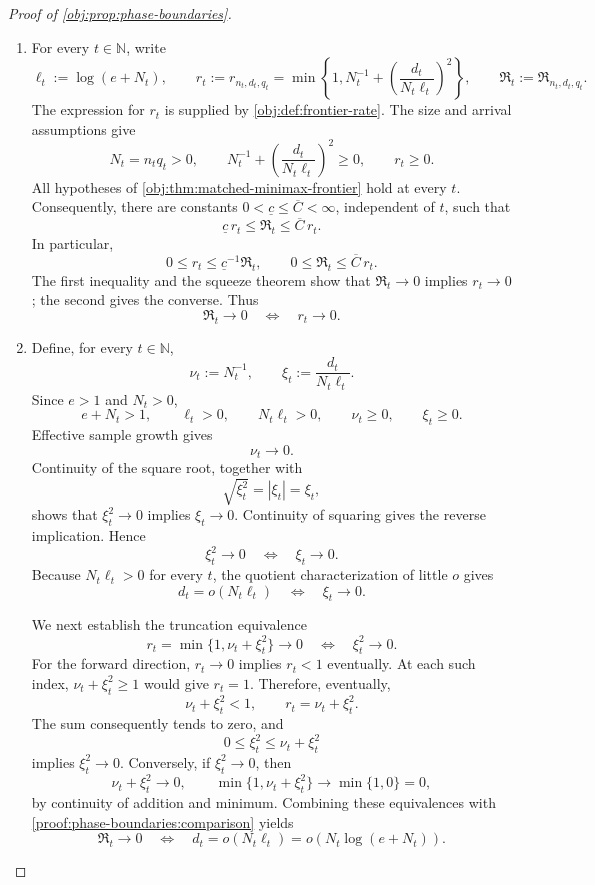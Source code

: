 \documentclass[11pt]{article}
\begin{document}
\begin{proof}[Proof of \cref{obj:prop:phase-boundaries}]
\begin{enumerate}
\item\label{proof:phase-boundaries:comparison} For every \(t\in\mathbb N\), write
\[
\ell_t:=\log(e+N_t),\qquad
r_t:=r_{n_t,d_t,q_t}
=\min\left\{1,N_t^{-1}
+\left(\frac{d_t}{N_t\ell_t}\right)^2\right\},
\qquad
\mathfrak R_t:=\mathfrak R_{n_t,d_t,q_t}.
\]
The expression for \(r_t\) is supplied by \cref{obj:def:frontier-rate}. The size and arrival assumptions give
\[
N_t=n_tq_t>0,\qquad
N_t^{-1}+\left(\frac{d_t}{N_t\ell_t}\right)^2\ge0,
\qquad r_t\ge0.
\]
All hypotheses of \cref{obj:thm:matched-minimax-frontier} hold at every \(t\). Consequently, there are constants
\(0<\underline c\le\overline C<\infty\), independent of \(t\), such that
\[
\underline c\,r_t\le\mathfrak R_t\le\overline C\,r_t.
\]
In particular,
\[
0\le r_t\le\underline c^{-1}\mathfrak R_t,
\qquad
0\le\mathfrak R_t\le\overline C\,r_t.
\]
The first inequality and the squeeze theorem show that
\(\mathfrak R_t\to0\) implies \(r_t\to0\); the second gives the converse. Thus
\[
\mathfrak R_t\longrightarrow0
\quad\Longleftrightarrow\quad
r_t\longrightarrow0.
\]

\item\label{proof:phase-boundaries:convergence} Define, for every \(t\in\mathbb N\),
\[
\nu_t:=N_t^{-1},
\qquad
\xi_t:=\frac{d_t}{N_t\ell_t}.
\]
Since \(e>1\) and \(N_t>0\),
\[
e+N_t>1,\qquad
\ell_t>0,\qquad
N_t\ell_t>0,\qquad
\nu_t\ge0,\qquad \xi_t\ge0.
\]
Effective sample growth gives
\[
\nu_t\longrightarrow0.
\]
Continuity of the square root, together with
\[
\sqrt{\xi_t^2}=|\xi_t|=\xi_t,
\]
shows that \(\xi_t^2\to0\) implies \(\xi_t\to0\). Continuity of squaring gives the reverse implication. Hence
\[
\xi_t^2\longrightarrow0
\quad\Longleftrightarrow\quad
\xi_t\longrightarrow0.
\]
Because \(N_t\ell_t>0\) for every \(t\), the quotient characterization of little \(o\) gives
\[
d_t=o(N_t\ell_t)
\quad\Longleftrightarrow\quad
\xi_t\longrightarrow0.
\]

We next establish the truncation equivalence
\[
r_t=\min\{1,\nu_t+\xi_t^2\}\longrightarrow0
\quad\Longleftrightarrow\quad
\xi_t^2\longrightarrow0.
\]
For the forward direction, \(r_t\to0\) implies \(r_t<1\) eventually. At each such index, \(\nu_t+\xi_t^2\ge1\) would give \(r_t=1\). Therefore, eventually,
\[
\nu_t+\xi_t^2<1,\qquad
r_t=\nu_t+\xi_t^2.
\]
The sum consequently tends to zero, and
\[
0\le\xi_t^2\le\nu_t+\xi_t^2
\]
implies \(\xi_t^2\to0\). Conversely, if \(\xi_t^2\to0\), then
\[
\nu_t+\xi_t^2\longrightarrow0,
\qquad
\min\{1,\nu_t+\xi_t^2\}\longrightarrow\min\{1,0\}=0,
\]
by continuity of addition and minimum. Combining these equivalences with \cref{proof:phase-boundaries:comparison} yields
\[
\mathfrak R_t\longrightarrow0
\quad\Longleftrightarrow\quad
d_t=o(N_t\ell_t)
=o\!\left(N_t\log(e+N_t)\right).
\]


\end{enumerate}
\end{proof}
\end{document}
